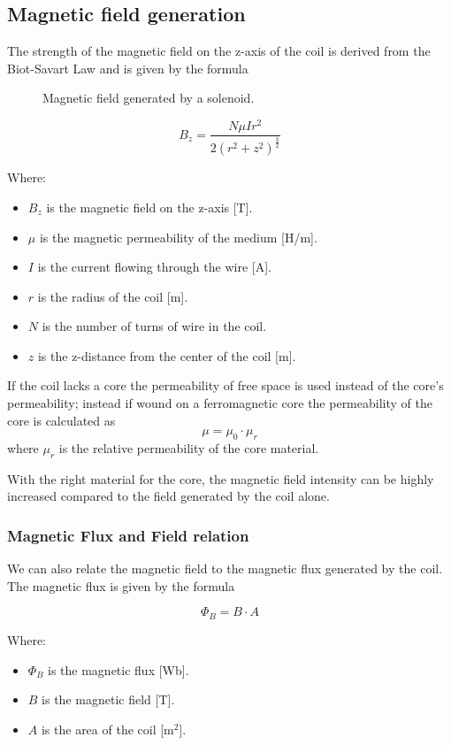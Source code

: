 \subsection{Magnetic field generation}
The strength of the magnetic field on the z-axis of the coil is derived from the Biot-Savart Law and is given by the formula
\begin{figure}
  \centering
  \resizebox{.7\linewidth}{!}{}
  \caption{Magnetic field generated by a solenoid.}
  \label{fig: Coil_magnetic_field}
\end{figure}


\begin{equation}
  B_z=\frac{N\mu Ir^2}{2(r^2+z^2)^\frac{3}{2}} \label{eq: Coil_magn_field}
\end{equation}


Where:
\begin{itemize}
  \item \( B_z \) is the magnetic field on the z-axis [T].
  \item \( \mu \) is the magnetic permeability of the medium [H/m].
  \item \( I \) is the current flowing through the wire [A].
  \item \( r \) is the radius of the coil [m].
  \item \( N \) is the number of turns of wire in the coil.
  \item \( z \) is the z-distance from the center of the coil [m].
\end{itemize}

If the coil lacks a core the permeability of free space is used instead of the core's permeability; instead if wound on a ferromagnetic core the permeability of the core is calculated as
\[\mu = \mu_0 \cdot \mu_r\]
where \( \mu_r \) is the relative permeability of the core material.

With the right material for the core, the magnetic field intensity can be highly increased compared to the field generated by the coil alone.


\subsubsection{Magnetic Flux and Field relation}
We can also relate the magnetic field to the magnetic flux generated by the coil. The magnetic flux is given by the formula

\begin{equation}
  \Phi_B=B \cdot A \label{eq: Magnetic_flux_&_field}
\end{equation}

Where:
\begin{itemize}
  \item \( \Phi_B \) is the magnetic flux [Wb].
  \item \( B \) is the magnetic field [T].
  \item \( A \) is the area of the coil [m\(^2\)].
\end{itemize}